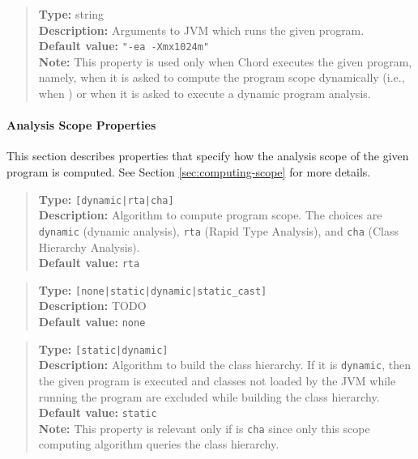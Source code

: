 \begin{quote}
{\bf Type:} string \\
{\bf Description:} Arguments to JVM which runs the given program. \\
{\bf Default value:} {\tt "-ea -Xmx1024m"} \\
{\bf Note:} This property is used only when Chord executes the given program, namely, when it is asked to compute the program scope dynamically (i.e., when ) or when it is asked to execute a dynamic program analysis. 
\end{quote}

\paragraph{Analysis Scope Properties}

This section describes properties that specify how the analysis scope of the given program is computed.
See Section \ref{sec:computing-scope} for more details.
\\[10pt]
\begin{quote}
{\bf Type:} {\tt [dynamic|rta|cha]} \\
{\bf Description:} Algorithm to compute program scope.  The choices are {\tt dynamic} (dynamic analysis), {\tt rta} (Rapid Type Analysis), and {\tt cha} (Class Hierarchy Analysis). \\
{\bf Default value:} {\tt rta}
\end{quote}

\begin{quote}
{\bf Type:} {\tt [none|static|dynamic|static\_cast]} \\
{\bf Description:} TODO \\
{\bf Default value:} {\tt none}
\end{quote}

\begin{quote}
{\bf Type:} {\tt [static|dynamic]} \\
{\bf Description:} Algorithm to build the class hierarchy.  If it is {\tt dynamic}, then the given program is executed and classes not loaded by the JVM while running the program are excluded while building the class hierarchy. \\
{\bf Default value:} {\tt static} \\
{\bf Note:} This property is relevant only if  is {\tt cha} since only this scope computing algorithm queries the class hierarchy. 
\end{quote}

